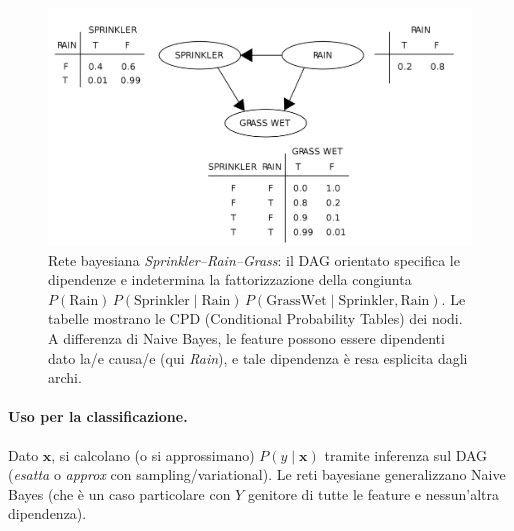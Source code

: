 \begin{figure}[htbp]
  \centering
  \includegraphics[width=.9\textwidth]{images/bayes_network_example.png}
  \caption[Bayes net Sprinkler–Rain–Grass]{Rete bayesiana \emph{Sprinkler–Rain–Grass}: il DAG orientato specifica le dipendenze e indetermina la fattorizzazione della congiunta
  \(P(\text{Rain})\,P(\text{Sprinkler}\mid \text{Rain})\,P(\text{GrassWet}\mid \text{Sprinkler},\text{Rain})\).
  Le tabelle mostrano le CPD (Conditional Probability Tables) dei nodi.
  A differenza di Naive Bayes, le feature possono essere dipendenti dato la/e causa/e (qui \textit{Rain}), e tale dipendenza è resa esplicita dagli archi.}
  \label{fig:bayes-net}
\end{figure}

\paragraph{Uso per la classificazione.}
Dato $\mathbf{x}$, si calcolano (o si approssimano) $P(y\mid \mathbf{x})$ tramite inferenza sul DAG (\emph{esatta} o \emph{approx} con sampling/variational). Le reti bayesiane generalizzano Naive Bayes (che è un caso particolare con $Y$ genitore di tutte le feature e nessun’altra dipendenza).